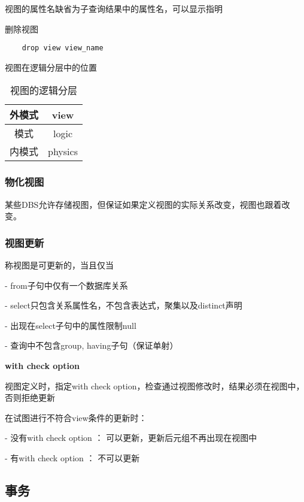 \documentclass{article}        %
\begin{document}
视图的属性名缺省为子查询结果中的属性名，可以显示指明

删除视图

\begin{verbatim}
    drop view view_name
\end{verbatim}

视图在逻辑分层中的位置

\begin{table}[htbp]
    \centering
    \label{example001}
    \caption{视图的逻辑分层}
    \begin{tabular}{|c|c|}
        \hline 
        外模式&view\\ 
        \hline 
        模式&logic \\ 
        \hline 
        内模式&physics \\ 
        \hline 
    \end{tabular}
\end{table}

\subsubsection{物化视图}

某些DBS允许存储视图，但保证如果定义视图的实际关系改变，视图也跟着改变。

\subsubsection{视图更新}

称视图是可更新的，当且仅当

- from子句中仅有一个数据库关系

- select只包含关系属性名，不包含表达式，聚集以及distinct声明

- 出现在select子句中的属性限制null

- 查询中不包含group, having子句（保证单射）

\textbf{with check option} 

视图定义时，指定with check option，检查通过视图修改时，结果必须在视图中，
否则拒绝更新

在试图进行不符合view条件的更新时：

- 没有with check option ：
可以更新，更新后元组不再出现在视图中

- 有with check option ：
不可以更新

\subsection{事务}
\end{document}
